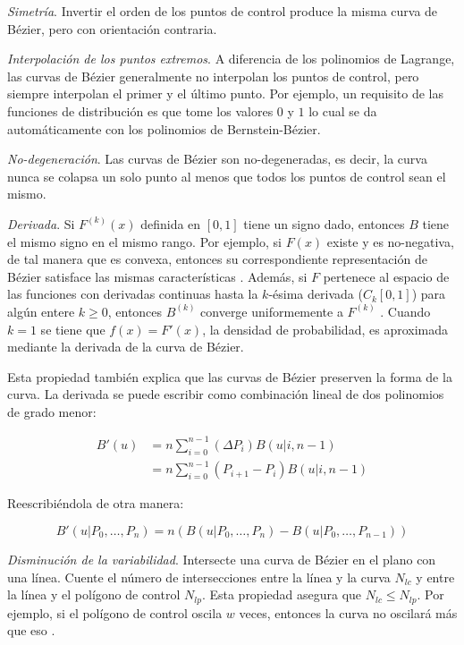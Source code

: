 \textit{Simetr\'ia}. Invertir el orden de los puntos de control produce la misma curva de B\'ezier, pero con orientaci\'on contraria.

\textit{Interpolaci\'on de los puntos extremos}. A diferencia de los polinomios de Lagrange, las curvas de B\'ezier generalmente no interpolan los puntos de control, pero siempre interpolan el primer y el \'ultimo punto.
Por ejemplo, un requisito de las funciones de distribuci\'on es que tome los valores $0$ y $1$ lo cual se da autom\'aticamente con los polinomios de Bernstein-B\'ezier.

\textit{No-degeneraci\'on}. Las curvas de B\'ezier son no-degeneradas, es decir, la curva nunca se colapsa un solo punto al menos que todos los puntos de control sean el mismo.

\textit{Derivada}. 
Si $F^{(k)}(x)$ definida en  $[0, 1]$ tiene un signo dado, entonces $B$ tiene el mismo signo en el mismo rango.
Por ejemplo, si $F(x)$ existe y es no-negativa, de tal manera que es convexa, entonces su correspondiente representaci\'on de B\'ezier satisface las mismas caracter\'isticas \citep[p. 254]{phillips_interpolation_2003}.
Adem\'as, si $F$ pertenece al espacio de las funciones con derivadas continuas hasta la $k$-\'esima derivada ($C_k[0, 1]$) para alg\'un entere $k \ge 0$, entonces $B^{(k)}$ converge uniformemente a $F^{(k)}$ \cite[p. 258]{phillips_interpolation_2003}.
Cuando $k = 1$ se tiene que $f(x)=F'(x)$, la densidad de probabilidad, es aproximada mediante la derivada de la curva de B\'ezier.

Esta propiedad tambi\'en explica que las curvas de B\'ezier preserven la forma de la curva.
La derivada se puede escribir como combinaci\'on lineal de dos polinomios de grado menor:

\begin{align}
	B'(u) &= n \sum_{i=0}^{n-1} (\Delta P_i) B(u|i, n-1) \\
	      &= n \sum_{i=0}^{n-1} (P_{i+1} - P_i) B(u|i,n-1)
\end{align}


Reescribi\'endola de otra manera:

\begin{equation}
	B'(u | P_0, \ldots, P_n) =
	n
	\left(
		B(u | P_0, \ldots, P_n) - 
		B(u | P_0, \ldots, P_{n-1})
	\right)
\end{equation}

\textit{Disminuci\'on de la variabilidad}. Intersecte una curva de B\'ezier en el plano con una l\'inea. Cuente el n\'umero de intersecciones entre la l\'inea y la curva $N_{lc}$ y entre la l\'inea y el pol\'igono de control $N_{lp}$. Esta propiedad asegura que  $N_{lc} \le N_{lp}$. Por ejemplo, si el pol\'igono de control oscila $w$ veces, entonces la curva no oscilar\'a m\'as que eso \citep{mann_blossoming_2006}.

